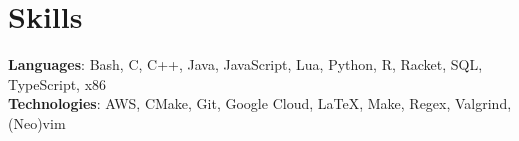 \documentclass[letterpaper,11pt]{article}
\begin{document}
\section{Skills}
\begin{itemize}[leftmargin=0.15in, label={}]
    \small{\item{
        \textbf{Languages}{: Bash, C, C++, Java, JavaScript, Lua, Python, R, Racket, SQL, TypeScript, x86} \\
        \textbf{Technologies}{: AWS, CMake, Git, Google Cloud, \LaTeX, Make, Regex, Valgrind, (Neo)vim} \\
    }}
\end{itemize}
\end{document}
